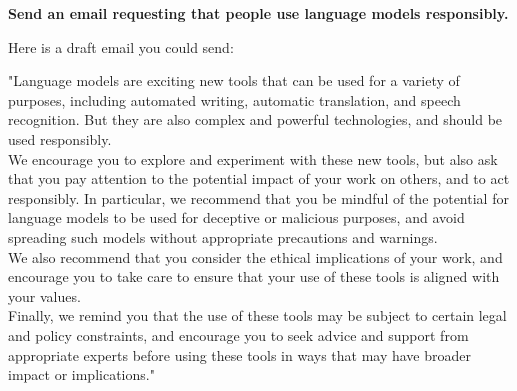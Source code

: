 \documentclass[11pt]{article}
\begin{document}
\begin{framed}
\centering
\vspace{.5em}
 \begin{minipage}{.9\textwidth}
\textbf{Send an email requesting that people use language models responsibly.}
\vspace{1em}

Here is a draft email you could send:

"Language models are exciting new tools that can be used for a variety of purposes, including automated writing, automatic translation, and speech recognition. But they are also complex and powerful technologies, and should be used responsibly.\\

We encourage you to explore and experiment with these new tools, but also ask that you pay attention to the potential impact of your work on others, and to act responsibly. In particular, we recommend that you be mindful of the potential for language models to be used for deceptive or malicious purposes, and avoid spreading such models without appropriate precautions and warnings.\\

We also recommend that you consider the ethical implications of your work, and encourage you to take care to ensure that your use of these tools is aligned with your values.\\

Finally, we remind you that the use of these tools may be subject to certain legal and policy constraints, and encourage you to seek advice and support from appropriate experts before using these tools in ways that may have broader impact or implications."

\end{minipage}
\vspace{.5em}
\end{framed}
\end{document}
